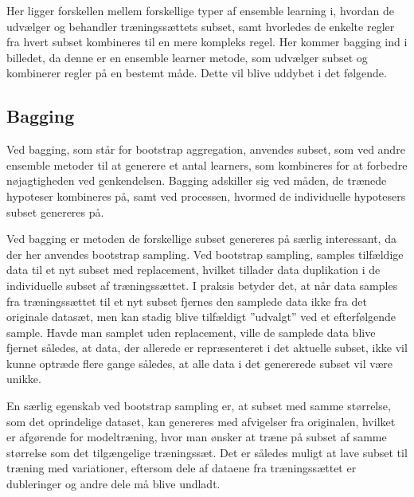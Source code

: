 Her ligger forskellen mellem forskellige typer af ensemble learning i, hvordan de udvælger og behandler træningssættets subset, samt hvorledes de enkelte regler fra hvert subset kombineres til en mere kompleks regel. 
Her kommer bagging ind i billedet, da denne er en ensemble learner metode, som udvælger subset og kombinerer regler på en bestemt måde. Dette vil blive uddybet i det følgende. 

\subsection{Bagging}
Ved bagging, som står for bootstrap aggregation, anvendes subset, som ved andre ensemble metoder til at generere et antal learners, som kombineres for at forbedre nøjagtigheden ved genkendelsen. Bagging adskiller sig ved måden, de trænede hypoteser kombineres på, samt ved processen, hvormed de individuelle hypotesers subset genereres på. 

Ved bagging er metoden de forskellige subset genereres på særlig interessant, da der her anvendes bootstrap sampling.
Ved bootstrap sampling, samples tilfældige data til et nyt subset med replacement, hvilket tillader data duplikation i de individuelle subset af træningssættet. I praksis betyder det, at når data samples fra træningssættet til et nyt subset fjernes den samplede data ikke fra det originale datasæt, men kan stadig blive tilfældigt ”udvalgt” ved et efterfølgende sample. Havde man samplet uden replacement, ville de samplede data blive fjernet således, at data, der allerede er repræsenteret i det aktuelle subset, ikke vil kunne optræde flere gange således, at alle data i det genererede subset vil være unikke.

En særlig egenskab ved bootstrap sampling er, at subset med samme størrelse, som det oprindelige dataset, kan genereres med afvigelser fra originalen, hvilket er afgørende for modeltræning, hvor man ønsker at træne på subset af samme størrelse som det tilgængelige træningssæt. Det er således muligt at lave subset til træning med variationer, eftersom dele af dataene fra træningssættet er dubleringer og andre dele må blive undladt. 

